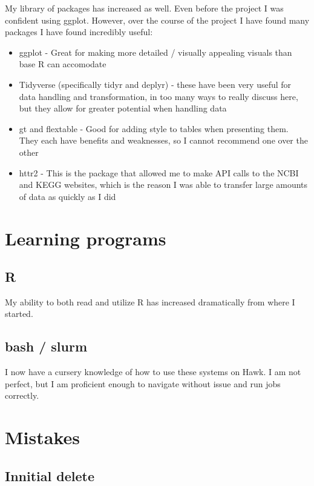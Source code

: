 \documentclass[
  letterpaper,
  DIV=11,
  numbers=noendperiod]{scrreprt}
\providecommand{\tightlist}{%
  \setlength{\itemsep}{0pt}\setlength{\parskip}{0pt}}\usepackage{longtable,booktabs,array}
\begin{document}
My library of packages has increased as well. Even before the project I
was confident using ggplot. However, over the course of the project I
have found many packages I have found incredibly useful:

\begin{itemize}
\tightlist
\item
  ggplot - Great for making more detailed / visually appealing visuals
  than base R can accomodate
\item
  Tidyverse (specifically tidyr and deplyr) - these have been very
  useful for data handling and transformation, in too many ways to
  really discuss here, but they allow for greater potential when
  handling data
\item
  gt and flextable - Good for adding style to tables when presenting
  them. They each have benefits and weaknesses, so I cannot recommend
  one over the other
\item
  httr2 - This is the package that allowed me to make API calls to the
  NCBI and KEGG websites, which is the reason I was able to transfer
  large amounts of data as quickly as I did
\end{itemize}

\section{Learning programs}\label{learning-programs}

\subsection{R}\label{r}

My ability to both read and utilize R has increased dramatically from
where I started.

\subsection{bash / slurm}\label{bash-slurm}

I now have a cursery knowledge of how to use these systems on Hawk. I am
not perfect, but I am proficient enough to navigate without issue and
run jobs correctly.

\section{Mistakes}\label{mistakes}

\subsection{Innitial delete}\label{innitial-delete}
\end{document}

